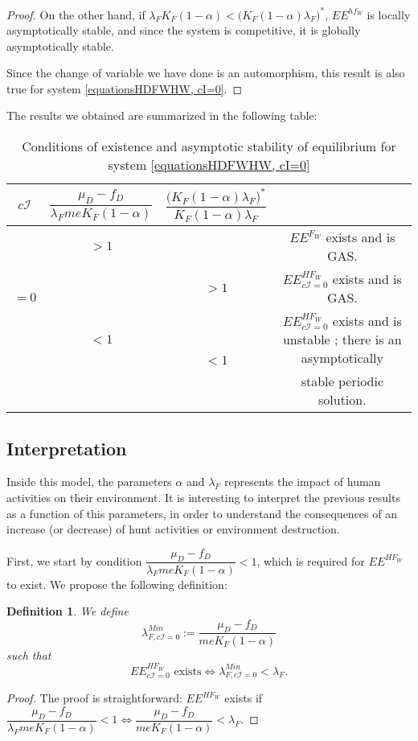 \documentclass{article}
\newcommand{\lfw}{\lambda_{F}}
\newcommand{\lfw}{\lambda_{F}}
\newcommand{\cI}{c \mathcal{I}}
\newtheorem{definition}{Definition}
\begin{document}
\begin{proof}
On the other hand, if $\lfw K_F(1-\alpha) < \Big(K_F(1-\alpha) \lfw \Big)^*$,  $EE^{hf_W}$ is locally asymptotically stable, and since the system is competitive, it is globally asymptotically stable.

Since the change of variable we have done is an automorphism, this result is also true for system \eqref{equationsHDFWHW, cI=0}.
\end{proof}

The results we obtained are summarized in the following table:
\begin{table}[!ht]
\centering
\def\arraystretch{2}
\begin{tabular}{c|c|c|c}
$\cI$ & $\dfrac{\mu_D - f_D}{\lfw m e K_F(1-\alpha)}$ &  $\dfrac{\Big(K_F(1-\alpha) \lfw \Big)^*}{K_F(1-\alpha) \lfw}$ & \\
\hline
\multirow{3}{*}{$=0$} & $ > 1$ & &$EE^{F_W}$ exists and is GAS.  \\
\cline{2-4}
 & \multirow{3}{*}{$< 1$} & $>1$ &$EE^{HF_W}_{\cI=0}$ exists and is GAS.\\
 \cline{3-4}
 & & \multirow{2}{*}{$ < 1$} & $EE^{HF_W}_{\cI=0}$ exists and is unstable ; there is an asymptotically \\
 & & &  stable periodic solution.
\end{tabular}
\caption{\centering Conditions of existence and asymptotic stability of equilibrium for system \eqref{equationsHDFWHW, cI=0}}
\end{table}


\subsection{Interpretation}
Inside this model, the parameters $\alpha$ and $\lfw$ represents the impact of human activities on their environment. It is interesting to interpret the previous results as a function of this parameters, in order to understand the consequences of an increase (or decrease) of hunt activities or environment destruction.

First, we start by condition $\dfrac{\mu_D - f_D}{\lfw m e K_F(1-\alpha)} < 1$, which is required for $EE^{HF_W}$ to exist. We propose the following definition:

\begin{definition}\label{defLambdaMin, cI=0} We define 
$$\lambda_{F, \cI=0}^{Min} := \dfrac{\mu_D - f_D}{m e K_F(1-\alpha)}$$
such that 
$$
\text{$EE^{HF_W}_{c\mathcal{I} = 0}$ exists} \Leftrightarrow \lambda_{F, \cI=0}^{Min}  <  \lfw.
$$
\end{definition}
\begin{proof}
The proof is straightforward: $EE^{HF_W}$ exists if $\dfrac{\mu_D - f_D}{\lfw m e K_F(1-\alpha)} < 1 \Leftrightarrow \dfrac{\mu_D - f_D}{ m e K_F(1-\alpha)} < \lfw$.
\end{proof}
\end{document}

